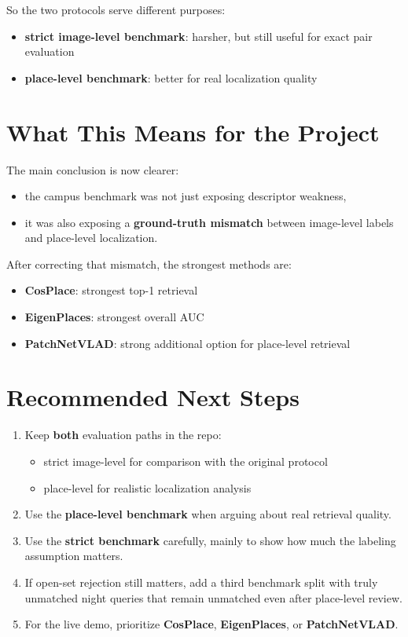 \documentclass[11pt]{article}
\begin{document}
So the two protocols serve different purposes:
\begin{itemize}[leftmargin=*]
  \item \textbf{strict image-level benchmark}: harsher, but still useful for exact pair evaluation
  \item \textbf{place-level benchmark}: better for real localization quality
\end{itemize}

\section{What This Means for the Project}
The main conclusion is now clearer:
\begin{itemize}[leftmargin=*]
  \item the campus benchmark was not just exposing descriptor weakness,
  \item it was also exposing a \textbf{ground-truth mismatch} between image-level labels and place-level localization.
\end{itemize}

After correcting that mismatch, the strongest methods are:
\begin{itemize}[leftmargin=*]
  \item \textbf{CosPlace}: strongest top-1 retrieval
  \item \textbf{EigenPlaces}: strongest overall AUC
  \item \textbf{PatchNetVLAD}: strong additional option for place-level retrieval
\end{itemize}

\section{Recommended Next Steps}
\begin{enumerate}[leftmargin=*]
  \item Keep \textbf{both} evaluation paths in the repo:
  \begin{itemize}[leftmargin=*]
    \item strict image-level for comparison with the original protocol
    \item place-level for realistic localization analysis
  \end{itemize}
  \item Use the \textbf{place-level benchmark} when arguing about real retrieval quality.
  \item Use the \textbf{strict benchmark} carefully, mainly to show how much the labeling assumption matters.
  \item If open-set rejection still matters, add a third benchmark split with truly unmatched night queries that remain unmatched even after place-level review.
  \item For the live demo, prioritize \textbf{CosPlace}, \textbf{EigenPlaces}, or \textbf{PatchNetVLAD}.
\end{enumerate}
\end{document}
